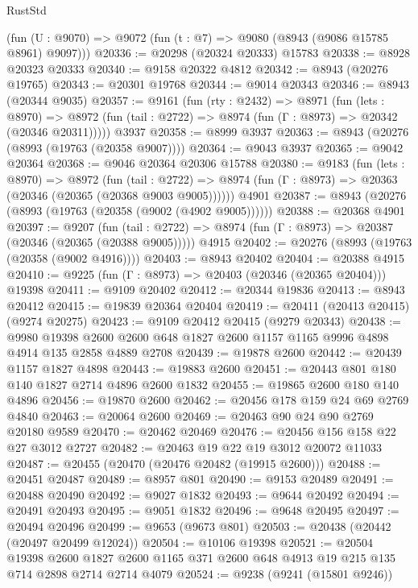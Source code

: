 \begin{lexlean}{RustStd}
\begin{coremodule}
{\begin{coremodule}
{{{{{{{{{{{{{{{{{{{{{{{{{{{{{{{{{{{{{{{    (fun (U : @9070) => @9072 (fun (t : @7) => @9080 (@8943 (@9086 @15785 @8961) @9097)))
@20336 := @20298 (@20324 @20333) @15783
@20338 := @8928 @20323 @20333
@20340 := @9158 @20322 @4812
@20342 := @8943 (@20276 @19765)
@20343 := @20301 @19768
@20344 := @9014 @20343
@20346 := @8943 (@20344 @9035)
@20357 := @9161
    (fun (rty : @2432) =>
    @8971
      (fun (lets : @8970) =>
      @8972 (fun (tail : @2722) => @8974 (fun (Γ : @8973) => @20342 (@20346 @20311)))))
    @3937
@20358 := @8999 @3937
@20363 := @8943 (@20276 (@8993 (@19763 (@20358 @9007))))
@20364 := @9043 @3937
@20365 := @9042 @20364
@20368 := @9046 @20364 @20306 @15788
@20380 := @9183
    (fun (lets : @8970) =>
    @8972
      (fun (tail : @2722) =>
      @8974 (fun (Γ : @8973) => @20363 (@20346 (@20365 (@20368 @9003 @9005))))))
    @4901
@20387 := @8943 (@20276 (@8993 (@19763 (@20358 (@9002 (@4902 @9005))))))
@20388 := @20368 @4901
@20397 := @9207
    (fun (tail : @2722) => @8974 (fun (Γ : @8973) => @20387 (@20346 (@20365 (@20388 @9005)))))
    @4915
@20402 := @20276 (@8993 (@19763 (@20358 (@9002 @4916))))
@20403 := @8943 @20402
@20404 := @20388 @4915
@20410 := @9225 (fun (Γ : @8973) => @20403 (@20346 (@20365 @20404))) @19398
@20411 := @9109 @20402
@20412 := @20344 @19836
@20413 := @8943 @20412
@20415 := @19839 @20364 @20404
@20419 := @20411 (@20413 @20415) (@9274 @20275)
@20423 := @9109 @20412 @20415 (@9279 @20343)
@20438 := @9980
    @19398
    @2600
    @2600
    @648
    @1827
    @2600
    @1157
    @1165
    @9996
    @4898
    @4914
    @135
    @2858
    @4889
    @2708
@20439 := @19878 @2600
@20442 := @20439 @1157 @1827 @4898
@20443 := @19883 @2600
@20451 := @20443 @801 @180 @140 @1827 @2714 @4896 @2600 @1832
@20455 := @19865 @2600 @180 @140 @4896
@20456 := @19870 @2600
@20462 := @20456 @178 @159 @24 @69 @2769 @4840
@20463 := @20064 @2600
@20469 := @20463 @90 @24 @90 @2769 @20180 @9589
@20470 := @20462 @20469
@20476 := @20456 @156 @158 @22 @27 @3012 @2727
@20482 := @20463 @19 @22 @19 @3012 @20072 @11033
@20487 := @20455 (@20470 (@20476 @20482 (@19915 @2600)))
@20488 := @20451 @20487
@20489 := @8957 @801
@20490 := @9153 @20489
@20491 := @20488 @20490
@20492 := @9027 @1832
@20493 := @9644 @20492
@20494 := @20491 @20493
@20495 := @9051 @1832
@20496 := @9648 @20495
@20497 := @20494 @20496
@20499 := @9653 (@9673 @801)
@20503 := @20438 (@20442 (@20497 @20499 @12024))
@20504 := @10106 @19398
@20521 := @20504
    @19398
    @2600
    @1827
    @2600
    @1165
    @371
    @2600
    @648
    @4913
    @19
    @215
    @135
    @714
    @2898
    @2714
    @2714
    @4079
@20524 := @9238 (@9241 (@15801 @9246))
}}}}}}}}}}}}}}}}}}}}}}}}}}}}}}}}}}}}}}}
\end{coremodule}}
\end{coremodule}
\end{lexlean}
